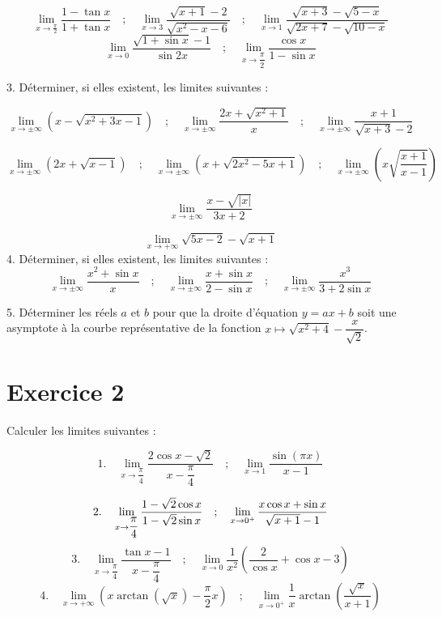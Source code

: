 \documentclass[12pt,a4paper]{article}
\begin{document}
\[
\lim_{x \to \frac{\pi}{2}} \dfrac{1 - \tan x}{1 + \tan x}\quad ; \quad \lim_{x \to 3} \dfrac{\sqrt{x+1} - 2}{\sqrt{x^2 - x - 6}}\quad ; \quad\lim_{x \to 1} \dfrac{\sqrt{x+3} - \sqrt{5-x}}{\sqrt{2x+7} - \sqrt{10-x}}
\]
\[
\lim_{x \to 0} \dfrac{\sqrt{1+\sin x} -1}{\sin 2x}\quad ; \quad\lim_{x \to \dfrac{\pi}{2}} \dfrac{\cos x}{1-\sin x}
\]

3. Déterminer, si elles existent, les limites suivantes :

\[
\lim_{x \to \pm \infty} \left(x - \sqrt{x^2 + 3x - 1}\right)\quad; \quad \lim_{x \to \pm \infty} \dfrac{2x + \sqrt{x^2 + 1}}{x}\quad; \quad
\lim_{x \to \pm \infty} \dfrac{x+1}{\sqrt{x+3}-2}
\]

\[
\lim_{x \to \pm \infty} \left(2x + \sqrt{x - 1}\right)\quad; \quad
\lim_{x \to \pm \infty} \left(x + \sqrt{2x^{2} - 5x + 1 }\right)\quad; \quad
\lim_{x \to \pm \infty} \left(x\sqrt{\dfrac{x+1}{x-1}}\right)
\]

\[
\lim_{x \to \pm \infty} \dfrac{x - \sqrt{|x|}}{3x + 2}
\]

\[
\lim_{x \to +\infty} \sqrt{5x-2}-\sqrt{x+1}
\]
4. Déterminer, si elles existent, les limites suivantes :
\[
\lim_{x \to \pm \infty} \dfrac{x^2 + \sin x}{x} \quad ; \quad \lim_{x \to \pm\infty} \dfrac{x + \sin x}{2 - \sin x} \quad ; \quad \lim_{x \to \pm \infty} \dfrac{x^3}{3 + 2 \sin x}
\]

5. Déterminer les réels \( a \) et \( b \) pour que la droite d'équation \( y = ax + b \) soit une asymptote à la courbe représentative de la fonction \( x \mapsto \sqrt{x^2 + 4} - \dfrac{x}{\sqrt{2}} \).

\section*{Exercice 2}

Calculer les limites suivantes :

\[
1. \quad \lim_{x \to \dfrac{\pi}{4}} \dfrac{2 \cos x - \sqrt{2}}{x - \dfrac{\pi}{4}} \quad ; \quad \lim_{x \to 1} \dfrac{\sin(\pi x)}{x - 1}
\]

\[
2. \quad \lim_{x \to \dfrac{\pi}{4}} \frac{1 - \sqrt{2} \cos x}{1 - \sqrt{2} \sin x} \quad ; \quad \lim_{x \to 0^+} \dfrac{x \cos x + \sin x}{\sqrt{x + 1} - 1} \\
\]
\[
3. \quad \lim_{x \to \dfrac{\pi}{4}} \dfrac{\tan x - 1}{x - \dfrac{\pi}{4}} \quad ; \quad \lim_{x \to 0} \dfrac{1}{x^2} \left( \dfrac{2}{\cos x }+ \cos x - 3 \right)
\]
\[
4. \quad \lim_{x \to +\infty} \left( x \arctan (\sqrt{x}) - \dfrac{\pi}{2} x \right) \quad ; \quad \lim_{x \to 0^+} \dfrac{1}{x} \arctan \left( \dfrac{\sqrt{x}}{x + 1} \right)
\]
\end{document}
